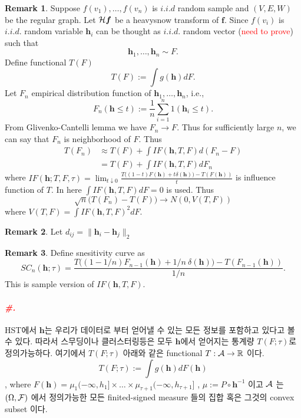 \documentclass[preprint, review, 12pt]{article}
\theoremstyle{definition}
\newtheorem{rmk}{Remark}[section]
\theoremstyle{remark}
\def\shrp{\paragraph{\textcolor{red}{\textit{\#.}}}}
\begin{document}
\begin{rmk}
Suppose $f(v_1),\dots,f(v_n)$ is $i.i.d$ random sample and $(V,E,W)$ be the regular graph. Let ${\cal H}\boldsymbol{f}$ be a heavysnow transform of ${\boldsymbol f}$. Since $f(v_i)$ is $i.i.d.$ random variable ${\boldsymbol h}_i$ can be thought as $i.i.d.$ random vector (\textcolor{red}{need to prove}) such that 
\[
{\boldsymbol h}_1,\dots,{\boldsymbol h}_n \sim F.
\] 
Define functional $T(F)$
\[
T(F):=\int g({\boldsymbol h}) dF.
\]
Let $F_n$ empirical distribution function of ${\boldsymbol h}_1,\dots,{\boldsymbol h}_n$, i.e., 
\[
F_n({\boldsymbol h}\leq t ) :=\frac{1}{n}\sum_{i=1}^{n}1({\boldsymbol h}_i\leq t).
\]
From Glivenko-Cantelli lemma we have $F_n \to F$. Thus for sufficiently large $n$, we can say that $F_n$ is neighborhood of $F$. Thus 
\begin{align*}
T(F_n) & \approx  T(F)+\int IF(\boldsymbol{h},T,F)d(F_n-F) \\
& = T(F)+\int IF(\boldsymbol{h},T,F) dF_n
\end{align*}
where $IF({\boldsymbol h}; T,F,\tau)= \lim_{t\downarrow 0}\frac{T\big((1-t)F(\boldsymbol{h}) + t \delta(\boldsymbol{h}) \big)-T(F(\boldsymbol{h}))}{t}$ is influence function of $T$. In here $\int IF(\boldsymbol{h},T,F)dF=0$ is used. Thus 
\[
\sqrt{n}\Big(T(F_n)-T(F) \Big) \to N(0,V(T,F))
\]
where $V(T,F)=\int IF(\boldsymbol{h},T,F)^2 dF$.
\end{rmk}

\begin{rmk}
Let $d_{ij}=\|{\boldsymbol h}_i-{\boldsymbol h}_j\|_2$
\end{rmk}

\begin{rmk}
Define snesitivity curve as 
\[
SC_{n}({\boldsymbol h};\tau)= \frac{T\big((1-1/n)F_{n-1}(\boldsymbol{h}) + 1/n ~ \delta(\boldsymbol{h}) \big)-T(F_{n-1}(\boldsymbol{h}))}{1/n}.
\]
This is sample version of $IF({\boldsymbol h},T,F)$.
\end{rmk}

\shrp HST에서 ${\boldsymbol h}$는 우리가 데이터로 부터 얻어낼 수 있는 모든 정보를 포함하고 있다고 볼 수 있다. 따라서 스무딩이나 클러스터링등은 모두 ${\boldsymbol h}$에서 얻어지는 통계량 $T(F;\tau)$로 정의가능하다. 여기에서 $T(F;\tau)$ 아래와 같은 functional $T:{\cal A} \to \mathbb{R}$ 이다. 
\[
T(F;\tau):=\int g({\boldsymbol h}) dF({\boldsymbol h})
\]
, where $F({\boldsymbol h})=\mu_1(-\infty,h_1]\times \dots \times \mu_{\tau+1}(-\infty,h_{\tau+1}]$ , $\mu:=P \circ {\boldsymbol h}^{-1}$ 이고 ${\cal A}$ 는 $(\Omega,{\cal F})$ 에서 정의가능한 모든 finited-signed measure 들의 집합 혹은 그것의 convex subset 이다. 
\end{document}
